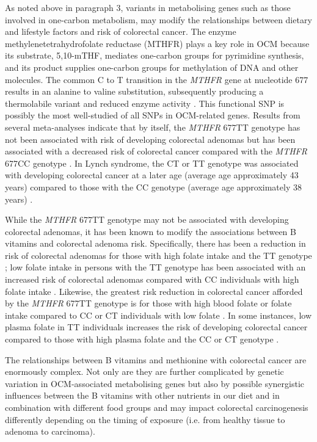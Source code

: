 \noindent As noted above in paragraph 3, variants in metabolising genes such as those involved in one-carbon metabolism, may modify the relationships between dietary and lifestyle factors and risk of colorectal cancer. The enzyme methylenetetrahydrofolate reductase (MTHFR) plays a key role in OCM because its substrate, 5,10-mTHF, mediates one-carbon groups for pyrimidine synthesis, and its product supplies one-carbon groups for methylation of DNA and other molecules. The common C to T transition in the \textit{MTHFR} gene at nucleotide 677 results in an alanine to valine substitution, subsequently producing a thermolabile variant and reduced enzyme activity \cite{c133}. This functional SNP is possibly the most well-studied of all SNPs in OCM-related genes. Results from several meta-analyses indicate that by itself, the \textit{MTHFR} 677TT genotype has not been associated with risk of developing colorectal adenomas \cite{c134,c135} but has been associated with a decreased risk of colorectal cancer compared with the \textit{MTHFR} 677CC genotype \cite{c134,c135,c136}. In Lynch syndrome, the CT or TT genotype was associated with developing colorectal cancer at a later age (average age approximately 43 years) compared to those with the CC genotype (average age approximately 38 years) \cite{c137,c138}. 
 
\noindent While the \textit{MTHFR} 677TT genotype may not be associated with developing colorectal adenomas, it has been known to modify the associations between B vitamins and colorectal adenoma risk. Specifically, there has been a reduction in risk of colorectal adenomas for those with high folate intake and the TT genotype \cite{c139,c140,c141}; low folate intake in persons with the TT genotype has been associated with an increased risk of colorectal adenomas compared with CC individuals with high folate intake \cite{c141}. Likewise, the greatest risk reduction in colorectal cancer afforded by the \textit{MTHFR} 677TT genotype is for those with high blood folate or folate intake compared to CC or CT individuals with low folate \cite{c142,c143,c144,c145}. In some instances, low plasma folate in TT individuals increases the risk of developing colorectal cancer compared to those with high plasma folate and the CC or CT genotype \cite{c144}. 
 
\noindent The relationships between B vitamins and methionine with colorectal cancer are enormously complex. Not only are they are further complicated by genetic variation in OCM-associated metabolising genes but also by possible synergistic influences between the B vitamins with other nutrients in our diet and in combination with different food groups and may impact colorectal carcinogenesis differently depending on the timing of exposure (i.e. from healthy tissue to adenoma to carcinoma). 
 
